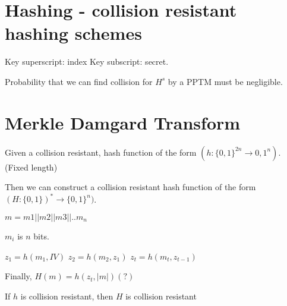 \section{Hashing - collision resistant hashing schemes}

Key superscript: index
Key subscript: secret.

Probability that we can find collision for $H^s$ by a PPTM must be negligible.


\section{Merkle Damgard Transform}

Given a collision resistant, hash function of the form $(h: \{0, 1\}^{2n} \to {0, 1}^n)$.
(Fixed length)

Then we can construct a collision resistant
hash function of the form $(H: \{0, 1\})^{*} \to \{0, 1\}^n)$.

$m = m1 || m2 || m3 || .. m_n$

$m_i$ is $n$ bits.


$z_1 = h(m_1, IV)$
$z_2 = h(m_2, z_1)$
$z_t = h(m_t, z_{t - 1})$

Finally, $H(m) = h(z_t, |m|) (?)$

If $h$ is collision resistant, then $H$ is collision resistant
